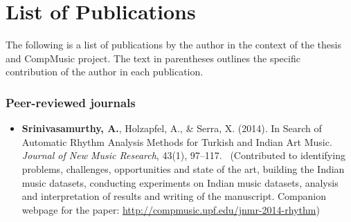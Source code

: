 \newcommand\contrib[1]{~{\footnotesize (#1)}}
% 
\newcommand\resource[2]{
	\noindent #1 \par
	\vspace{0.2em}
	{\centering	\url{#2} \par}
	\vspace{0.5em}
	\hrule \par 
	\vspace{0.8em} \par}
%
%
\chapter[List of Publications][List of Publications]{List of Publications}\label{app:mypapers}%
The following is a list of publications by the author in the context of the thesis and CompMusic project. The text in parentheses outlines the specific contribution of the author in each publication. 
\subsection*{Peer-reviewed journals}
\begin{itemize}[leftmargin=*]
	\item \textbf{Srinivasamurthy, A.}, Holzapfel, A., \& Serra, X. (2014). In Search of Automatic Rhythm Analysis Methods for Turkish and Indian Art Music. \textit{Journal of New Music Research}, 43(1), 97--117. \contrib{Contributed to identifying problems, challenges, opportunities and state of the art, building the Indian music datasets, conducting experiments on Indian music datasets, analysis and interpretation of results and writing of the manuscript. Companion webpage for the paper: \url{http://compmusic.upf.edu/jnmr-2014-rhythm}} %
\end{itemize}
%
